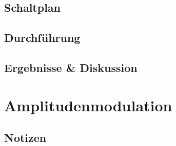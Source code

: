 \documentclass[12pt,a4paper,titlepage]{article}
\begin{document}
\subsection*{Schaltplan}

\subsection*{Durchf\"uhrung}

\subsection*{Ergebnisse \& Diskussion}

\section{Amplitudenmodulation}

\subsection*{Notizen}
%
%
%
%
\end{document}
